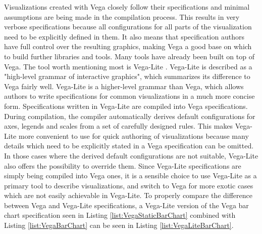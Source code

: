 Visualizations created with Vega closely follow their specifications and minimal assumptions are being made in the compilation process.
This results in very verbose specifications because all configurations for all parts of the visualization need to be explicitly defined in them.
It also means that specification authors have full control over the resulting graphics, making Vega a good base on which to build further libraries and tools.
Many tools \parencite{Voyager,Lyra,CompassQL} have already been built on top of Vega.
The tool worth mentioning most is Vega-Lite \parencite{VegaLite}.
Vega-Lite is described as a "high-level grammar of interactive graphics", which summarizes its difference to Vega fairly well.
Vega-Lite is a higher-level grammar than Vega, which allows authors to write specifications for common visualizations in a much more concise form.
Specifications written in Vega-Lite are compiled into Vega specifications.
During compilation, the compiler automatically derives default configurations for axes, legends and scales from a set of carefully designed rules.
This makes Vega-Lite more convenient to use for quick authoring of visualizations because many details which need to be explicitly stated in a Vega specification can be omitted.
In those cases where the derived default configurations are not suitable, Vega-Lite also offers the possibility to override them.
Since Vega-Lite specifications are simply being compiled into Vega ones, it is a sensible choice to use Vega-Lite as a primary tool to describe visualizations, and switch to Vega for more exotic cases which are not easily achievable in Vega-Lite.
To properly compare the difference between Vega and Vega-Lite specifications, a Vega-Lite version of the Vega bar chart specification seen in Listing \ref{list:VegaStaticBarChart} combined with Listing \ref{list:VegaBarChart} can be seen in Listing \ref{list:VegaLiteBarChart}.

\begin{samepage}
 
    This is a Vega-Lite specification of the Vega bar chart specification seen in Listing \ref{list:VegaStaticBarChart} combined with Listing \ref{list:VegaBarChart}.
  },
]{listings/vega-lite-bar-chart.json}
\end{samepage}

